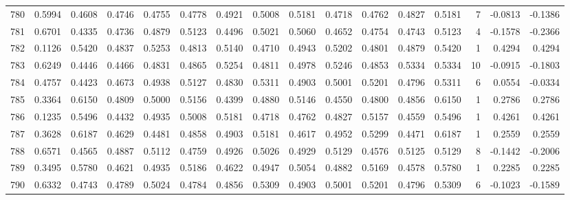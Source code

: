 \begin{tabular}{lrrrrrrrrrrrrrrr}
780 &      0.5994 &  0.4608 &  0.4746 &  0.4755 &  0.4778 &  0.4921 &  0.5008 &  0.5181 &  0.4718 &  0.4762 &   0.4827 &     0.5181 &      7 &                   -0.0813 &                    -0.1386 \\
781 &      0.6701 &  0.4335 &  0.4736 &  0.4879 &  0.5123 &  0.4496 &  0.5021 &  0.5060 &  0.4652 &  0.4754 &   0.4743 &     0.5123 &      4 &                   -0.1578 &                    -0.2366 \\
782 &      0.1126 &  0.5420 &  0.4837 &  0.5253 &  0.4813 &  0.5140 &  0.4710 &  0.4943 &  0.5202 &  0.4801 &   0.4879 &     0.5420 &      1 &                    0.4294 &                     0.4294 \\
783 &      0.6249 &  0.4446 &  0.4466 &  0.4831 &  0.4865 &  0.5254 &  0.4811 &  0.4978 &  0.5246 &  0.4853 &   0.5334 &     0.5334 &     10 &                   -0.0915 &                    -0.1803 \\
784 &      0.4757 &  0.4423 &  0.4673 &  0.4938 &  0.5127 &  0.4830 &  0.5311 &  0.4903 &  0.5001 &  0.5201 &   0.4796 &     0.5311 &      6 &                    0.0554 &                    -0.0334 \\
785 &      0.3364 &  0.6150 &  0.4809 &  0.5000 &  0.5156 &  0.4399 &  0.4880 &  0.5146 &  0.4550 &  0.4800 &   0.4856 &     0.6150 &      1 &                    0.2786 &                     0.2786 \\
786 &      0.1235 &  0.5496 &  0.4432 &  0.4935 &  0.5008 &  0.5181 &  0.4718 &  0.4762 &  0.4827 &  0.5157 &   0.4559 &     0.5496 &      1 &                    0.4261 &                     0.4261 \\
787 &      0.3628 &  0.6187 &  0.4629 &  0.4481 &  0.4858 &  0.4903 &  0.5181 &  0.4617 &  0.4952 &  0.5299 &   0.4471 &     0.6187 &      1 &                    0.2559 &                     0.2559 \\
788 &      0.6571 &  0.4565 &  0.4887 &  0.5112 &  0.4759 &  0.4926 &  0.5026 &  0.4929 &  0.5129 &  0.4576 &   0.5125 &     0.5129 &      8 &                   -0.1442 &                    -0.2006 \\
789 &      0.3495 &  0.5780 &  0.4621 &  0.4935 &  0.5186 &  0.4622 &  0.4947 &  0.5054 &  0.4882 &  0.5169 &   0.4578 &     0.5780 &      1 &                    0.2285 &                     0.2285 \\
790 &      0.6332 &  0.4743 &  0.4789 &  0.5024 &  0.4784 &  0.4856 &  0.5309 &  0.4903 &  0.5001 &  0.5201 &   0.4796 &     0.5309 &      6 &                   -0.1023 &                    -0.1589 \\

\end{tabular}
